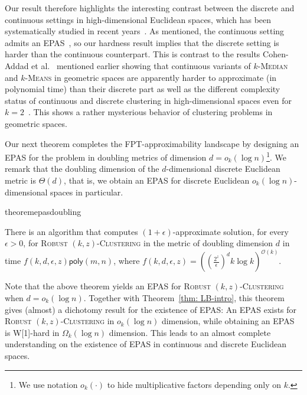 \documentclass[11pt]{article}
\newcommand{\poly}{\ensuremath{\textsf{poly}}}
\newcommand{\km}{\textsc{$k$-Median}\xspace}
\newcommand{\kmns}{\textsc{$k$-Means}\xspace}
\newcommand{\fpt}{\textsf{FPT}\xspace}
\newcommand{\rkc}{\textsc{Robust $(k,z)$-Clustering}\xspace}
\newcommand{\bigO}[1]{\ensuremath{\mathcal{O}\left(#1\right)}}
\begin{document}
Our result therefore highlights the interesting contrast between the discrete and continuous settings in high-dimensional Euclidean spaces, which has been systematically studied in recent years~\cite{cohen2022johnson,cohen2019inapproximability,cohen2021approximability}.
As mentioned, the continuous setting admits an EPAS~\cite{abbasi-etal23:epas-norm-clustering}, so  our hardness result  implies that the discrete setting is harder than the continuous counterpart. 
This is contrast to the results Cohen-Addad et al.~\cite{cohen2021approximability} mentioned earlier showing that continuous variants of \km and \kmns in geometric spaces  are apparently harder to approximate (in polynomial time) than their discrete part as well as the different complexity status of continuous and discrete clustering in high-dimensional spaces even for $k=2$~\cite{drineas-etal04:np-hardness-2-means-highdim}. This shows a rather mysterious behavior of clustering problems in geometric spaces. 


Our next theorem completes the \fpt-approximability landscape by designing an EPAS for the problem in doubling metrics of dimension $d = o_k(\log n)$\footnote{We use notation $o_k(\cdot)$ to hide multiplicative factors depending only on $k$.}. We remark that the doubling dimension of the $d$-dimensional discrete Euclidean metric is $\Theta(d)$, that is, we obtain an EPAS for discrete Euclidean $o_k(\log n)$-dimensional spaces in particular.

\begin{restatable} {theorem}{epasdoubling}\label{thm:pas_kd}

There is an algorithm that computes $(1+\epsilon)$-approximate solution, for every $\epsilon>0$,  for \rkc in the metric of doubling dimension $d$ in time $f(k,d,\epsilon,z) \poly(m,n)$, where $f(k,d,\epsilon,z) = \left(\left(\frac{2^z}{\epsilon}\right)^d k \log k\right)^{\bigO{k}}$.

\end{restatable} 


Note that the above theorem yields an EPAS for \rkc when $d=o_k(\log n)$.
Together with Theorem~\ref{thm: LB-intro}, this theorem gives (almost) a dichotomy result for the existence of EPAS: An EPAS exists for \rkc in $o_k(\log n)$ dimension, while obtaining an EPAS is W[1]-hard in $\Omega_k(\log n)$ dimension. This leads to an almost complete understanding on the existence of EPAS in continuous and discrete Euclidean spaces. 
\end{document}
